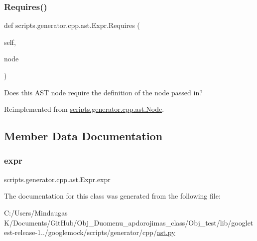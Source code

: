 \subsubsection{\texorpdfstring{Requires()}{Requires()}}
{\footnotesize\ttfamily def scripts.\+generator.\+cpp.\+ast.\+Expr.\+Requires (\begin{DoxyParamCaption}\item[{}]{self,  }\item[{}]{node }\end{DoxyParamCaption})}

\begin{DoxyVerb}Does this AST node require the definition of the node passed in?\end{DoxyVerb}
 

Reimplemented from \mbox{\hyperlink{classscripts_1_1generator_1_1cpp_1_1ast_1_1_node_a37c4215d199947155270a485a3add21e}{scripts.\+generator.\+cpp.\+ast.\+Node}}.



\subsection{Member Data Documentation}
\mbox{\label{classscripts_1_1generator_1_1cpp_1_1ast_1_1_expr_aa9a19b6b16005f4327b11e6247a9180a}} 
\subsubsection{\texorpdfstring{expr}{expr}}
{\footnotesize\ttfamily scripts.\+generator.\+cpp.\+ast.\+Expr.\+expr}



The documentation for this class was generated from the following file\+:\begin{DoxyCompactItemize}
\item 
C\+:/\+Users/\+Mindaugas K/\+Documents/\+Git\+Hub/\+Obj\+\_\+\+Duomenu\+\_\+apdorojimas\+\_\+class/\+Obj\+\_\+test/lib/googletest-\/release-\/1../googlemock/scripts/generator/cpp/\mbox{\hyperlink{_obj__test_2lib_2googletest-release-1_88_81_2googlemock_2scripts_2generator_2cpp_2ast_8py}{ast.\+py}}\end{DoxyCompactItemize}
